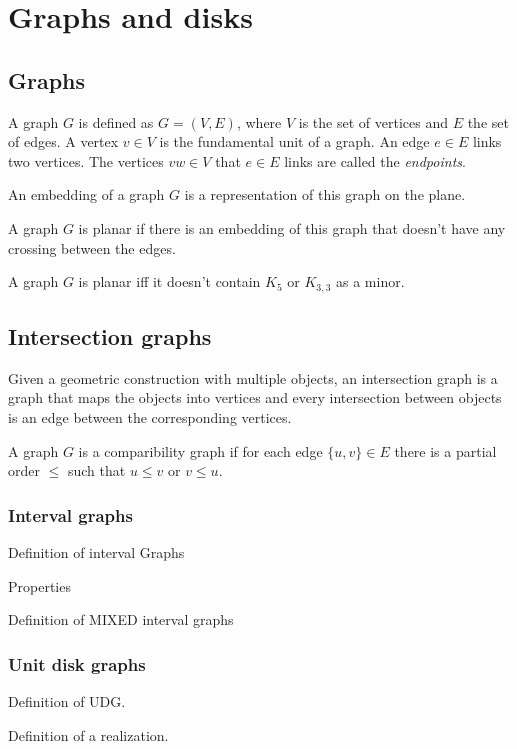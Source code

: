 \section{Graphs and disks}
\label{sec:graphs}


\subsection{Graphs}

A graph $G$ is defined as $G = (V,E)$, where $V$ is the set of vertices and $E$ the set of edges. A vertex $v \in V$ is the fundamental unit of a graph. An edge $e \in E$ links two vertices. The vertices $vw \in V$ that $e \in E$ links are called the \textit{endpoints}.

\begin{defn}
  An embedding of a graph $G$ is a representation of this graph on the plane.
\end{defn}

A graph $G$ is planar if there is an embedding of this graph that doesn't have any crossing between the edges.

\begin{theorem}[Kuratowski]
  A graph $G$ is planar iff it doesn't contain $K_5$ or $K_{3,3}$ as a minor.
\end{theorem}


\subsection{Intersection graphs}


Given a geometric construction with multiple objects, an intersection graph is a
graph that maps the objects into vertices and every intersection between objects
is an edge between the corresponding vertices.

\begin{defn}
  A graph $G$ is a comparibility graph if for each edge $\{u,v\} \in E$ there is
  a partial order $\leq$ such that $u \leq v$ or $v \leq u$.
\end{defn}

\subsubsection{Interval graphs}

Definition of interval Graphs

Properties

Definition of MIXED interval graphs
\subsubsection{Unit disk graphs}


Definition of UDG.

Definition of a realization.
